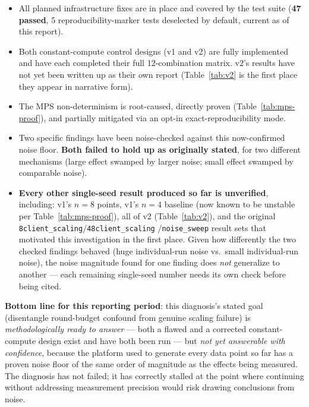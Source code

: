 \documentclass[11pt]{article}
\newcommand{\code}[1]{\texttt{#1}}
\begin{document}
\begin{itemize}[leftmargin=1.4em]
    \item All planned infrastructure fixes are in place and covered by the test suite
    (\textbf{47 passed}, 5 reproducibility-marker tests deselected by default, current as of this
    report).
    \item Both constant-compute control designs (v1 and v2) are fully implemented and have each
    completed their full 12-combination matrix. v2's results have not yet been written up as their
    own report (Table~\ref{tab:v2} is the first place they appear in narrative form).
    \item The MPS non-determinism is root-caused, directly proven (Table~\ref{tab:mps-proof}), and
    partially mitigated via an opt-in exact-reproducibility mode.
    \item Two specific findings have been noise-checked against this now-confirmed noise floor.
    \textbf{Both failed to hold up as originally stated}, for two different mechanisms (large effect
    swamped by larger noise; small effect swamped by comparable noise).
    \item \textbf{Every other single-seed result produced so far is unverified}, including: v1's
    $n{=}8$ points, v1's $n{=}4$ baseline (now known to be unstable per Table~\ref{tab:mps-proof}),
    all of v2 (Table~\ref{tab:v2}), and the original \code{8client\_scaling}/\code{48client\_scaling}
    /\code{noise\_sweep} result sets that motivated this investigation in the first place. Given how
    differently the two checked findings behaved (huge individual-run noise vs.\ small
    individual-run noise), the noise magnitude found for one finding does \emph{not} generalize to
    another --- each remaining single-seed number needs its own check before being cited.
\end{itemize}

\textbf{Bottom line for this reporting period}: this diagnosis's stated goal (disentangle
round-budget confound from genuine scaling failure) is \emph{methodologically ready to answer} --- both a flawed
and a corrected constant-compute design exist and have both been run --- but \emph{not yet
answerable with confidence}, because the platform used to generate every data point so far has a
proven noise floor of the same order of magnitude as the effects being measured. The diagnosis has
not failed; it has correctly stalled at the point where continuing without addressing measurement
precision would risk drawing conclusions from noise.
\end{document}
